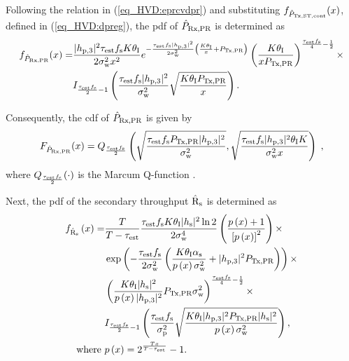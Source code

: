 Following the relation in (\ref{eq_HVD:eprcvdpr}) and substituting $f_{\hat{P}_{\text{Tx,ST,cont}}}(x)$, defined in (\ref{eq_HVD:dpreg}), the pdf of $\hat{P}_{\text{Rx,PR}}$ is determined as 
\begin{align}
f_{\hat{P}_{\text{Rx,PR}}}(x) =& \frac{|h_{\text{p,3}}|^2 \tau_{\text{est}} f_{\text{s}} K \theta_{\text{I}}}{2\sigma^2_{\text{w}} x^2} e^{- \frac{\tau_{\text{est}} f_{\text{s}} |h_{\text{p,3}}|^2}{2 \sigma^2_{\text{w}}}\left( \frac{K  \theta_{\text{I}}}{x} + P_{\text{Tx,PR}} \right)} \left( \frac{K \theta_{\text{I}}}{x P_{\text{Tx,PR}}}   \right)^{\frac{\tau_{\text{est}} f_{\text{s}}}{4} - \frac{1}{2}} \times \label{eq_HVD:dpp} \\
\quad & I_{\frac{\tau_{\text{est}} f_{\text{s}}}{2}  - 1}\left( \frac{\tau_{\text{est}} f_{\text{s}} |h_{\text{p,3}}|^2}{\sigma^2_{\text{w}}} \sqrt{\frac{ K \theta_{\text{I}} P_{\text{Tx,PR}}}{x}}  \right). \nonumber
\end{align}

Consequently, the cdf of $\hat{P}_{\text{Rx,PR}}$ is given by %
\begin{equation}
	\label{eq_HVD:cdf}
	\fprcvdpr(x) = Q_{\frac{\test \fsam}{2}}\left(\sqrt{\frac{\test \fsam \ptran \phpth}{\npp}},\sqrt{\frac{\test \fsam \phpth \ite K}{\npp x}}\right) \;  ,
\end{equation}
where $Q_{\frac{\tau_{\text{est}} f_{\text{s}}}{2}}(\cdot)$ is the Marcum Q-function \cite{Jef00}.

Next, the pdf of the secondary throughput $\hat{\text{{R}}}_{\text{s}}$ is determined as
\begin{align}
	f_{\hat{\text{{R}}}_{\text{s}}} \left(x\right)  =&  \frac{T}{T-\tau_{\text{est}}}\frac{\tau_{\text{est}} f_{\text{s}} K \theta_{\text{I}} |h_{\text{s}}|^2 \ln{2}}{2 \sigma^4_{\text{w}}} 
	\left(\frac{p\left(x\right)+1}{\left[p\left(x\right)\right]^2} \right) \times \label{eq_HVD:drs} \\ 
	& \exp \left(-\frac{\tau_{\text{est}} f_{\text{s}}}{2 \sigma^2_{\text{w}}} \left(\frac{K \theta_\textrm{I} \alpha_\textrm{s}}{p\left(x\right)\sigma^2_{\text{w}}} + |h_{\text{p,3}}|^2 P_{\text{Tx,PR}} \right) \right) \times \nonumber \\ 
	& \left(\frac{K \theta_{\text{I}} |h_{\text{s}}|^2}{p\left(x\right) |h_{\text{p,3}}|^2} P_{\text{Tx,PR}} \sigma^2_{\text{w}}\right)^{\frac{\tau_{\text{est}} f_{\text{s}}}{4}-\frac{1}{2}} \times \nonumber \\
	& I_{\frac{\tau_{\text{est}} f_{\text{s}}}{2}-1}\left(\frac{\tau_{\text{est}} f_{\text{s}}}{\sigma_\textrm{p}^2}\sqrt{\frac{K \theta_{\text{I}} |h_{\text{p,3}}|^2 P_{\text{Tx,PR}} |h_{\text{s}}|^2}{p\left(x\right) \sigma^2_{\text{w}}}}\right), \nonumber \\
\text{where } & p\left(x\right) = 2^\frac{Tx}{T-\tau_{\text{est}}}-1 \nonumber.
\end{align}



